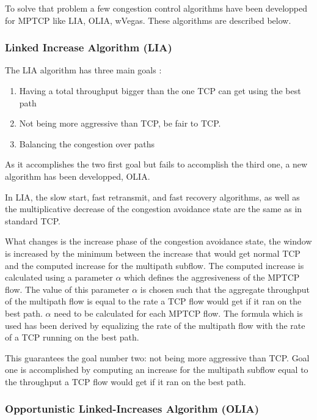   To solve that problem a few congestion control algorithms have been developped for MPTCP like LIA, OLIA, wVegas. These algorithms are described below.

  \subsubsection{ Linked Increase Algorithm (LIA)} \label{sec:lia}

  The LIA algorithm has three main goals :

  \begin{enumerate}
    \item Having a total throughput bigger than the one TCP can get using the best path
    \item Not being more aggressive than TCP, be fair to TCP.
    \item Balancing the congestion over paths
  \end{enumerate}

  As it accomplishes the two first goal but fails to accomplish the third one,  a new algorithm has been developped, OLIA.

  In LIA, the slow start, fast retransmit, and fast recovery algorithms, as well as the multiplicative decrease of the congestion avoidance state are the same as in standard TCP.

  What changes is the increase phase of the congestion avoidance state, the window is increased by the minimum between the increase that would get normal TCP and the computed increase
  for the multipath subflow. The computed increase is calculated using a parameter $\alpha$ which defines the aggresiveness of the MPTCP flow. The value of this parameter $\alpha$ is chosen such that the aggregate
  throughput of the multipath flow is equal to the rate a TCP flow would get if it ran on the best path.
  $\alpha$ need to be calculated for each MPTCP flow. The formula which is used has been derived by equalizing the rate of the multipath flow with the rate of a TCP running on the best path.

  This guarantees the goal number two: not being more aggressive than TCP. Goal one is accomplished by computing an increase for the multipath subflow equal to
  the throughput a TCP flow would get if it ran on the best path.

  \subsubsection{ Opportunistic Linked-Increases Algorithm (OLIA)} \label{sec:olia}

